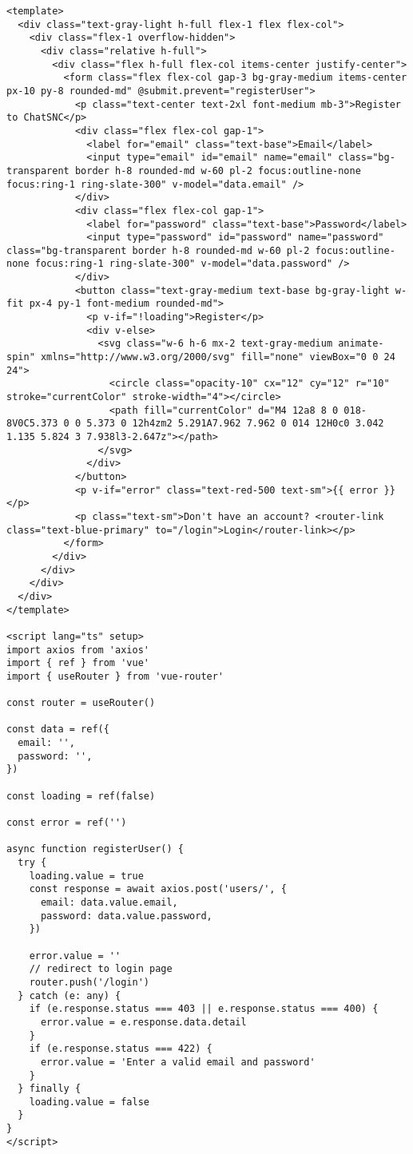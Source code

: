 \begin{Verbatim}[breaklines=true, breakanywhere=true]
<template>
  <div class="text-gray-light h-full flex-1 flex flex-col">
    <div class="flex-1 overflow-hidden">
      <div class="relative h-full">
        <div class="flex h-full flex-col items-center justify-center">
          <form class="flex flex-col gap-3 bg-gray-medium items-center px-10 py-8 rounded-md" @submit.prevent="registerUser">
            <p class="text-center text-2xl font-medium mb-3">Register to ChatSNC</p>
            <div class="flex flex-col gap-1">
              <label for="email" class="text-base">Email</label>
              <input type="email" id="email" name="email" class="bg-transparent border h-8 rounded-md w-60 pl-2 focus:outline-none focus:ring-1 ring-slate-300" v-model="data.email" />
            </div>
            <div class="flex flex-col gap-1">
              <label for="password" class="text-base">Password</label>
              <input type="password" id="password" name="password" class="bg-transparent border h-8 rounded-md w-60 pl-2 focus:outline-none focus:ring-1 ring-slate-300" v-model="data.password" />
            </div>
            <button class="text-gray-medium text-base bg-gray-light w-fit px-4 py-1 font-medium rounded-md">
              <p v-if="!loading">Register</p>
              <div v-else>
                <svg class="w-6 h-6 mx-2 text-gray-medium animate-spin" xmlns="http://www.w3.org/2000/svg" fill="none" viewBox="0 0 24 24">
                  <circle class="opacity-10" cx="12" cy="12" r="10" stroke="currentColor" stroke-width="4"></circle>
                  <path fill="currentColor" d="M4 12a8 8 0 018-8V0C5.373 0 0 5.373 0 12h4zm2 5.291A7.962 7.962 0 014 12H0c0 3.042 1.135 5.824 3 7.938l3-2.647z"></path>
                </svg>
              </div>
            </button>
            <p v-if="error" class="text-red-500 text-sm">{{ error }}</p>
            <p class="text-sm">Don't have an account? <router-link class="text-blue-primary" to="/login">Login</router-link></p>
          </form>
        </div>
      </div>
    </div>
  </div>
</template>

<script lang="ts" setup>
import axios from 'axios'
import { ref } from 'vue'
import { useRouter } from 'vue-router'

const router = useRouter()

const data = ref({
  email: '',
  password: '',
})

const loading = ref(false)

const error = ref('')

async function registerUser() {
  try {
    loading.value = true
    const response = await axios.post('users/', {
      email: data.value.email,
      password: data.value.password,
    })

    error.value = ''
    // redirect to login page
    router.push('/login')
  } catch (e: any) {
    if (e.response.status === 403 || e.response.status === 400) {
      error.value = e.response.data.detail
    }
    if (e.response.status === 422) {
      error.value = 'Enter a valid email and password'
    }
  } finally {
    loading.value = false
  }
}
</script>

\end{Verbatim}

